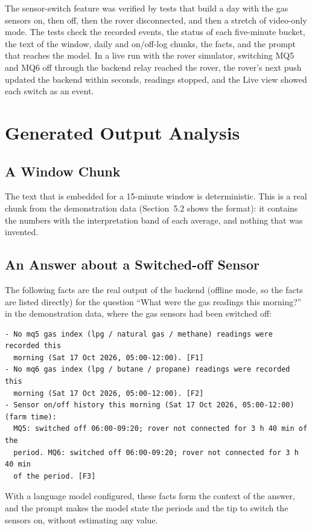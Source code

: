 The sensor-switch feature was verified by tests that build a day with the gas sensors on, then off, then the rover disconnected, and then
a stretch of video-only mode. The tests check the recorded events, the status of each five-minute bucket, the text of the window,
daily and on/off-log chunks, the facts, and the prompt that reaches the model. In a live run with the rover simulator, switching MQ5
and MQ6 off through the backend relay reached the rover, the rover's next push updated the backend within seconds, readings stopped, and the Live
view showed each switch as an event.

\section{Generated Output Analysis}

\subsection{A Window Chunk}

The text that is embedded for a 15-minute window is deterministic. This is a real chunk from the demonstration data
(Section~5.2 shows the format): it contains the numbers with the interpretation band of each average, and nothing that was invented.

\subsection{An Answer about a Switched-off Sensor}

The following facts are the real output of the backend (offline mode, so the facts are listed directly) for the question
``What were the gas readings this morning?'' in the demonstration data, where the gas sensors had been switched off:

\begin{lstlisting}
- No mq5 gas index (lpg / natural gas / methane) readings were recorded this
  morning (Sat 17 Oct 2026, 05:00-12:00). [F1]
- No mq6 gas index (lpg / butane / propane) readings were recorded this
  morning (Sat 17 Oct 2026, 05:00-12:00). [F2]
- Sensor on/off history this morning (Sat 17 Oct 2026, 05:00-12:00) (farm time):
  MQ5: switched off 06:00-09:20; rover not connected for 3 h 40 min of the
  period. MQ6: switched off 06:00-09:20; rover not connected for 3 h 40 min
  of the period. [F3]
\end{lstlisting}

\noindent With a language model configured, these facts form the context of the answer, and the prompt makes the model state the periods and
the tip to switch the sensors on, without estimating any value.


